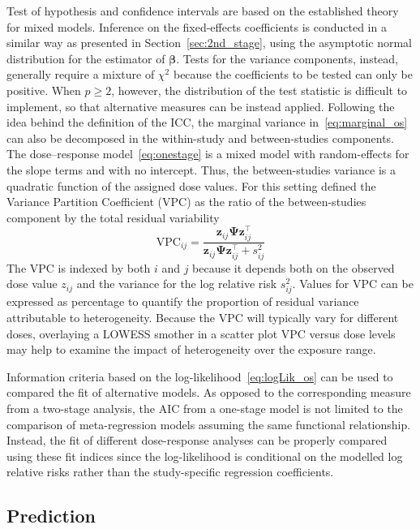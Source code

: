 \documentclass[11pt,a4paper,twoside,openany]{book}\usepackage{knitr}
\begin{document}
{Test of hypothesis and confidence intervals are based on the established theory for mixed models. Inference on the fixed-effects coefficients is conducted in a similar way as presented in Section~\ref{sec:2nd_stage}, using the asymptotic normal distribution for the estimator of $\boldsymbol{\beta}$. Tests for the variance components, instead, generally require a mixture of $\chi^2$ because the coefficients to be tested can only be positive. When $p \ge 2$, however, the distribution of the test statistic is difficult to implement, so that alternative measures can be instead applied. Following the idea behind the definition of the ICC, the marginal variance in~\ref{eq:marginal_os} can also be decomposed in the within-study and between-studies components. The dose--response model~\ref{eq:onestage} is a mixed model with random-effects for the slope terms and with no intercept. Thus, the between-studies variance is a quadratic function of the assigned dose values. For this setting \cite{goldstein2002partitioning} defined the Variance Partition Coefficient (VPC) as the ratio of the between-studies component by the total residual variability
\begin{equation}
\textrm{VPC}_{ij} = \frac{\mathbf{z}_{ij} \boldsymbol{\Psi} \mathbf{z}_{ij}^\top}{\mathbf{z}_{ij} \boldsymbol{\Psi} \mathbf{z}_{ij}^\top  + s_{ij}^2}
\label{eq:vpc}
\end{equation}
\noindent The VPC is indexed by both $i$ and $j$ because it depends both on the observed dose value $z_{ij}$ and the variance for the log relative risk $s_{ij}^2$. Values for VPC can be expressed as percentage to quantify the proportion of residual variance attributable to heterogeneity. Because the VPC will typically vary for different doses, overlaying a LOWESS smother in a scatter plot VPC versus dose levels may help to examine the impact of heterogeneity over the exposure range.

Information criteria based on the log-likelihood~\ref{eq:logLik_os} can be used to compared the fit of alternative models. As opposed to the corresponding measure from a two-stage analysis, the AIC from a one-stage model is not limited to the comparison of meta-regression models assuming the same functional relationship. Instead, the fit of different dose-response analyses can be properly compared using these fit indices since the log-likelihood is conditional on the modelled log relative risks rather than the study-specific regression coefficients. 



\subsection{Prediction}

}
\end{document}
